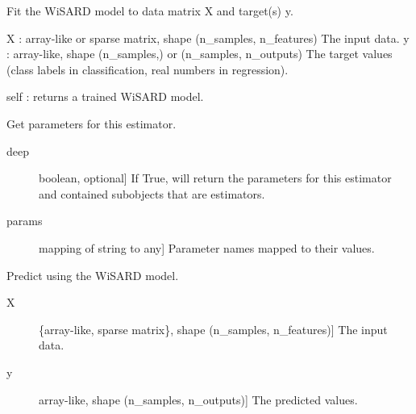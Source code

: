 \documentclass[letterpaper,10pt,english]{sphinxmanual}
\begin{document}
\begin{fulllineitems}
\begin{fulllineitems}
\label{\detokenize{index:wis.WisardClassifier.fit}}
Fit the WiSARD model to data matrix X and target(s) y.

X : array-like or sparse matrix, shape (n\_samples, n\_features)
The input data.
y : array-like, shape (n\_samples,) or (n\_samples, n\_outputs)
The target values (class labels in classification, real numbers in
regression).

self : returns a trained WiSARD model.

\end{fulllineitems}


\begin{fulllineitems}
\label{\detokenize{index:wis.WisardClassifier.get_params}}
Get parameters for this estimator.
\begin{description}
\item[{deep}] \leavevmode{[}boolean, optional{]}
If True, will return the parameters for this estimator and
contained subobjects that are estimators.

\end{description}
\begin{description}
\item[{params}] \leavevmode{[}mapping of string to any{]}
Parameter names mapped to their values.

\end{description}

\end{fulllineitems}


\begin{fulllineitems}
\label{\detokenize{index:wis.WisardClassifier.predict}}
Predict using the WiSARD model.
\begin{description}
\item[{X}] \leavevmode{[}\{array-like, sparse matrix\}, shape (n\_samples, n\_features){]}
The input data.

\end{description}
\begin{description}
\item[{y}] \leavevmode{[}array-like, shape (n\_samples, n\_outputs){]}
The predicted values.


\end{description}
\end{fulllineitems}
\end{fulllineitems}
\end{document}
